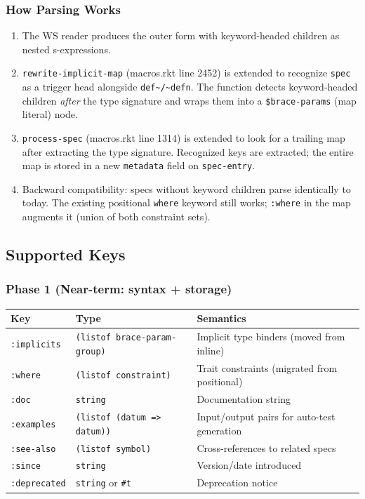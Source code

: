 \documentclass[11pt]{article}
\begin{document}
\subsubsection{How Parsing Works}
\label{sec:org05fda01}

\begin{enumerate}
\item The WS reader produces the outer form with keyword-headed children as nested
s-expressions.

\item \texttt{rewrite-implicit-map} (macros.rkt line 2452) is extended to recognize \texttt{spec}
as a trigger head alongside \texttt{def\textasciitilde{}/\textasciitilde{}defn}. The function detects keyword-headed
children \emph{after} the type signature and wraps them into a \texttt{\$brace-params}
(map literal) node.

\item \texttt{process-spec} (macros.rkt line 1314) is extended to look for a trailing map
after extracting the type signature. Recognized keys are extracted; the entire
map is stored in a new \texttt{metadata} field on \texttt{spec-entry}.

\item Backward compatibility: specs without keyword children parse identically to
today. The existing positional \texttt{where} keyword still works; \texttt{:where} in the
map augments it (union of both constraint sets).
\end{enumerate}
\subsection{Supported Keys}
\label{sec:org6df9fa7}

\subsubsection{Phase 1 (Near-term: syntax + storage)}
\label{sec:org3643dee}

\begin{center}
\begin{tabular}{lll}
Key & Type & Semantics\\
\hline
\texttt{:implicits} & \texttt{(listof brace-param-group)} & Implicit type binders (moved from inline)\\
\texttt{:where} & \texttt{(listof constraint)} & Trait constraints (migrated from positional)\\
\texttt{:doc} & \texttt{string} & Documentation string\\
\texttt{:examples} & \texttt{(listof (datum => datum))} & Input/output pairs for auto-test generation\\
\texttt{:see-also} & \texttt{(listof symbol)} & Cross-references to related specs\\
\texttt{:since} & \texttt{string} & Version/date introduced\\
\texttt{:deprecated} & \texttt{string} or \texttt{\#t} & Deprecation notice\\
\end{tabular}
\end{center}
\end{document}
